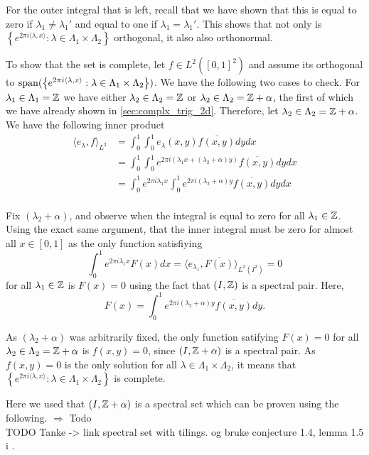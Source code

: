 \documentclass[../thesis.tex]{subfiles}
\begin{document}
For the outer integral that is left, recall that we have shown that this is equal to zero if $\lambda_1\neq\lambda_1'$ and equal to one if $\lambda_1 = \lambda_1'$. This shows that not only is $\left\{ e^{2\pi i \langle \lambda,x  \rangle } : \lambda \in \Lambda_1\times\Lambda_2\right\}$ orthogonal, it also also orthonormal. 


To show that the set is complete, let $f\in L^2([0,1]^2)$ and assume its orthogonal to $\operatorname{span}(\left\{ e^{2\pi i \langle \lambda,x  \rangle } : \lambda \in \Lambda_1\times\Lambda_2\right\})$. We have the following two cases to check. For $\lambda_1\in\Lambda_1=\mathbb{Z}$ we have either $\lambda_2\in \Lambda_2=\mathbb{Z}$ or $\lambda_2\in \Lambda_2=\mathbb{Z}+\alpha$, the first of which we have already shown in \cref{sec:complx_trig_2d}. Therefore, let $\lambda_2\in \Lambda_2=\mathbb{Z}+\alpha$. We have the following inner product
\begin{align*}
    \langle e_\lambda, f \rangle_{L^2} 
    &= \int_0^1 \int_0^1 e_\lambda(x,y) \overline{f(x,y)} dydx \\   &= \int_0^1 \int_0^1 e^{2\pi i  (\lambda_1x + (\lambda_2+\alpha) y)} \overline{f(x,y)} dydx \\
    &= \int_0^1 e^{2 \pi i \lambda_1 x}\int_0^1 e^{2 \pi i (\lambda_2+\alpha) y} \overline{f(x,y)} dydx \\
\end{align*}

Fix $(\lambda_2+\alpha)$, and observe when the integral is equal to zero for all $\lambda_1\in \mathbb{Z}$. Using the exact same argument, that the inner integral must be zero for almost all $x\in[0,1]$ as the only function satisfiying 
\begin{equation*}
    \int_0^1 e^{2 \pi i \lambda_1 x} F(x)dx = \langle e_{\lambda_1}, \overline{F(x)}\rangle_{L^2(I^2)} = 0
\end{equation*}
for all $\lambda_1 \in \mathbb{Z}$ is $F(x)=0$ using the fact that $(I,\mathbb{Z})$ is a spectral pair. Here,
\begin{equation*}
    F(x) = \int_0^1 e^{2 \pi i (\lambda_2+\alpha) y} \overline{f(x,y)} dy.
\end{equation*}

As $(\lambda_2+\alpha)$ was arbitrarily fixed, the only function satifying $F(x) = 0 $ for all $\lambda_2 \in \Lambda_2=\mathbb{Z}+\alpha$ is $f(x,y)=0$, since $(I, \mathbb{Z}+\alpha)$ is a spectral pair. As $f(x,y)=0$ is the only solution for all $\lambda \in \Lambda_1 \times \Lambda_2$, it means that $\left\{ e^{2\pi i \langle \lambda,x  \rangle } : \lambda \in \Lambda_1\times\Lambda_2\right\}$ is complete. 

Here we used that $(I, \mathbb{Z}+\alpha)$ is a spectral set which can be proven using the following.
$\Longrightarrow$ Todo\\
TODO Tanke -> link spectral set with tilings. og bruke conjecture 1.4, lemma 1.5 i \cite{jorgensenSpectralPairsCartesian2001}. 




\end{document}
